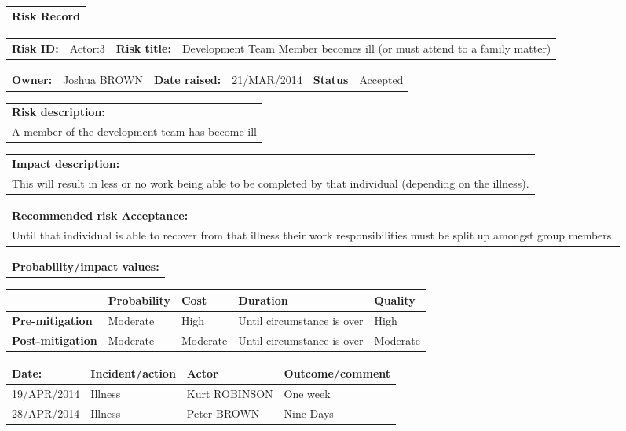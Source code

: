 \begin{table}
	\begin{tabularx}{\textwidth}{| X |}
		\hline
		\textbf{Risk Record} \\
	\end{tabularx}
	\begin{tabularx}{\textwidth}{| l | X | l | X |}
		\hline
		\textbf{Risk ID:} & Actor:3 & \textbf{Risk title:} & Development Team Member becomes ill (or must attend to a family matter) \\
	\end{tabularx}
	\begin{tabularx}{\textwidth}{| l | X | l | X | l | X |}
		\hline
		\textbf{Owner:} & Joshua BROWN & \textbf{Date raised:} & 21/MAR/2014 & \textbf{Status} & Accepted \\
	\end{tabularx}
	\begin{tabularx}{\textwidth}{| X |}
		\hline
		\textbf{Risk description:} \\ A member of the development team has become ill \\
	\end{tabularx}
	\begin{tabularx}{\textwidth}{| X |}
		\hline
		\textbf{Impact description:} \\ This will result in less or no work being able to be completed by that individual (depending on the illness). \\
	\end{tabularx}
	\begin{tabularx}{\textwidth}{| X |}
		\hline
		\textbf{Recommended risk Acceptance:} \\ Until that individual is able to recover from that illness their work responsibilities must be split up amongst group members. \\
	\end{tabularx}
	\begin{tabularx}{\textwidth}{| X |}
		\hline
		\textbf{Probability/impact values:} \\
	\end{tabularx}
	\begin{tabularx}{\textwidth}{| l | l | X | X | X |}
		\hline
		 &  \textbf{Probability} & \textbf{Cost} & \textbf{Duration} & \textbf{Quality} \\ \hline
		\textbf{Pre-mitigation} & Moderate & High & Until circumstance is over & High\\ \hline
		\textbf{Post-mitigation} & Moderate & Moderate & Until circumstance is over & Moderate \\ \hline \hline
	\end{tabularx}
	\begin{tabularx}{\textwidth}{| l | X | l | X |}
		\hline
		\textbf{Date:} & \textbf{Incident/action} & \textbf{Actor} & \textbf{Outcome/comment} \\ \hline
		  19/APR/2014 & Illness & Kurt ROBINSON & One week \\ \hline
		 28/APR/2014 & Illness & Peter BROWN & Nine Days\\ \hline
	\end{tabularx}
\end{table}

